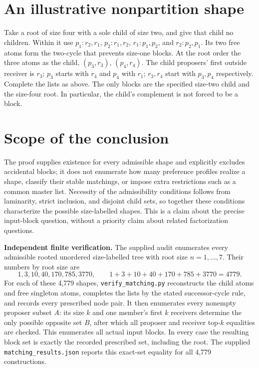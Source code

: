 \documentclass[11pt]{article}
\theoremstyle{definition}
\begin{document}
\section*{An illustrative nonpartition shape}
Take a root of size four with a sole child of size two, and give that
child no children. Within it use $p_1:r_2,r_1$,
$p_2:r_1,r_2$, $r_1:p_1,p_2$, and $r_2:p_2,p_1$.
Its two free atoms form the two-cycle that prevents size-one blocks.
At the root order the three atoms as the child, $(p_3,r_3)$,
$(p_4,r_4)$. The child proposers' first outside receiver is $r_3$;
$p_3$ starts with $r_4$ and $p_4$ with $r_1$; $r_3,r_4$ start with
$p_3,p_4$ respectively. Complete the lists as above. The only blocks
are the specified size-two child and the size-four root. In particular,
the child's complement is not forced to be a block.

\section*{Scope of the conclusion}
The proof supplies existence for every admissible shape and explicitly
excludes accidental blocks; it does not enumerate how many preference
profiles realize a shape, classify their stable matchings, or impose
extra restrictions such as a common master list. Necessity of the
admissibility conditions follows from laminarity, strict inclusion,
and disjoint child sets, so together these conditions characterize
the possible size-labelled shapes. This is a claim about the precise
input-block question, without a priority claim about related
factorization questions.

\textbf{Independent finite verification.} The supplied audit \cite{audit} enumerates every admissible rooted unordered size-labelled tree with root size $n=1,\ldots,7$. Their numbers by root size are
\[
 1,3,10,40,170,785,3770,
 \qquad 1+3+10+40+170+785+3770=4779.
\]
For each of these 4,779 shapes, \texttt{verify\_matching.py} reconstructs the child atoms and free singleton atoms, completes the lists by the stated successor-cycle rule, and records every prescribed node pair. It then enumerates every nonempty proposer subset $A$: its size $k$ and one member's first $k$ receivers determine the only possible opposite set $B$, after which all proposer and receiver top-$k$ equalities are checked. This enumerates all actual input blocks. In every case the resulting block set is exactly the recorded prescribed set, including the root. The supplied \texttt{matching\_results.json} reports this exact-set equality for all 4,779 constructions.
\end{document}
